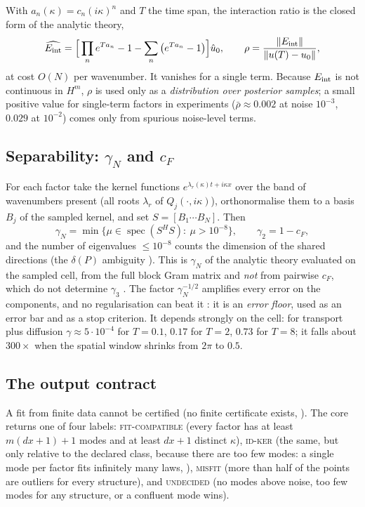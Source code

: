 With $a_n(\kappa)=c_n(i\kappa)^n$ and $T$ the time span, the interaction ratio is the closed form of the analytic theory,
\begin{equation}\label{eq:rho}
\widehat{E_{\mathrm{int}}}=\Big[\prod_ne^{Ta_n}-1-\sum_n\big(e^{Ta_n}-1\big)\Big]\hat u_0,\qquad
\rho=\frac{\|E_{\mathrm{int}}\|}{\|u(T)-u_0\|},
\end{equation}
at cost $O(N)$ per wavenumber. It vanishes for a single term. Because $E_{\mathrm{int}}$ is not continuous in $H^m$, $\rho$ is used only as a \emph{distribution over posterior samples}; a small positive value for single-term factors in experiments ($\bar\rho\approx0.002$ at noise $10^{-3}$, $0.029$ at $10^{-2}$) comes only from spurious noise-level terms.

\subsection{Separability: $\gamma_N$ and $c_F$}
For each factor take the kernel functions $e^{\lambda_r(\kappa)t+i\kappa x}$ over the band of wavenumbers present (all roots $\lambda_r$ of $Q_j(\cdot,i\kappa)$), orthonormalise them to a basis $B_j$ of the sampled kernel, and set $S=[B_1\cdots B_N]$. Then
\begin{equation}\label{eq:gammaN}
\gamma_N=\min\{\mu\in\operatorname{spec}(S^{H}S):\ \mu>10^{-8}\},\qquad \gamma_2=1-c_F,
\end{equation}
and the number of eigenvalues $\le10^{-8}$ counts the dimension of the shared directions (the $\delta(P)$ ambiguity ). This is $\gamma_N$ of the analytic theory evaluated on the sampled cell, from the full block Gram matrix and \emph{not} from pairwise $c_F$, which do not determine $\gamma_3$ . The factor $\gamma_N^{-1/2}$ amplifies every error on the components, and no regularisation can beat it : it is an \emph{error floor}, used as an error bar and as a stop criterion. It depends strongly on the cell: for transport plus diffusion $\gamma\approx5\cdot10^{-4}$ for $T=0.1$, $0.17$ for $T=2$, $0.73$ for $T=8$; it falls about $300\times$ when the spatial window shrinks from $2\pi$ to $0.5$.

\subsection{The output contract}
\begin{caution}[title=The core never says ``identified'']
A fit from finite data cannot be certified (no finite certificate exists, ). The core returns one of four labels: \textsc{fit-compatible} (every factor has at least $m(dx+1)+1$ modes and at least $dx+1$ distinct $\kappa$), \textsc{id-ker} (the same, but only relative to the declared class, because there are too few modes: a single mode per factor fits infinitely many laws, ), \textsc{misfit} (more than half of the points are outliers for every structure), and \textsc{undecided} (no modes above noise, too few modes for any structure, or a confluent mode wins).
\end{caution}

